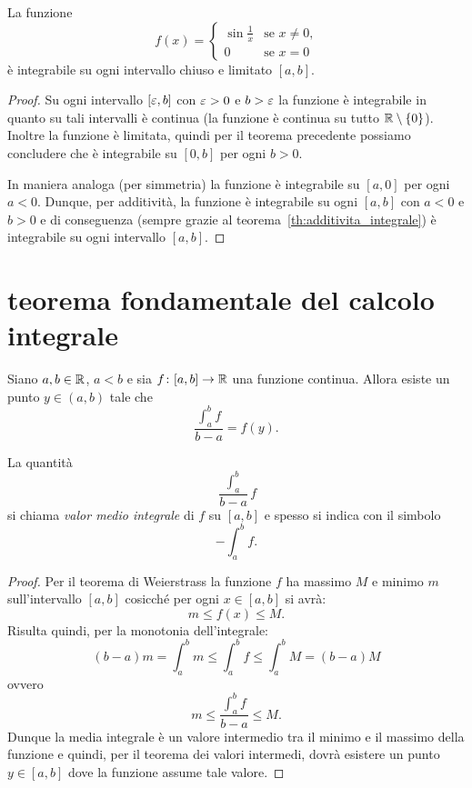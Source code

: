 \begin{example}
La funzione
\[
  f(x) = \begin{cases}
  \sin\frac 1 x & \text{se $x\neq 0$,}\\
  0 & \text{se $x=0$}
  \end{cases}
\]
è integrabile su ogni intervallo chiuso e limitato $[a,b]$.
\end{example}
\begin{proof}
Su ogni intervallo $[\varepsilon,b]$ con $\varepsilon>0$ e $b>\varepsilon$ la funzione
è integrabile in quanto su tali intervalli è continua (la funzione è continua su
tutto $\mathbb R\setminus\{0\}$). Inoltre la funzione è limitata, quindi per il teorema
precedente possiamo concludere che è integrabile su $[0,b]$ per ogni $b>0$.

In maniera analoga (per simmetria) la funzione è integrabile su $[a,0]$
per ogni $a<0$.
Dunque, per additività, la funzione è integrabile su ogni $[a,b]$ con $a<0$ e $b>0$
e di conseguenza (sempre grazie al teorema~\ref{th:additivita_integrale})
è integrabile su ogni intervallo $[a,b]$.
\end{proof}

\section{teorema fondamentale del calcolo integrale}

\begin{theorem}
\mymark{***}
Siano $a,b\in \mathbb R$, $a<b$ e sia
$f\colon [a,b] \to \mathbb R$ una funzione continua.
Allora esiste un punto $y \in (a,b)$
tale che
\[
\frac{\int_a^b f}{b-a} = f(y).
\]
\end{theorem}
%
La quantità
\[
  \frac{\int_a^b}{b-a} f
\]
si chiama \emph{valor medio integrale} di $f$ su $[a,b]$ e spesso
si indica con il simbolo
\[
  -\!\!\!\!\!\!\int_a^b f.
\]
%
\begin{proof}
\mymark{***}
Per il teorema di Weierstrass la funzione $f$ ha massimo $M$ e minimo $m$
sull'intervallo $[a,b]$ cosicché
per ogni $x\in [a,b]$ si avrà:
\[
  m \le f(x) \le M.
\]
Risulta quindi, per la monotonia dell'integrale:
\[
  (b-a) m = \int_a^b m \le \int_a^b f \le \int_a^b M = (b-a) M
\]
ovvero
\[
  m \le \frac{\int_a^b f}{b-a} \le M.
\]
Dunque la media integrale è un valore intermedio tra il minimo e il massimo
della funzione e quindi, per il teorema dei valori intermedi,
dovrà esistere un punto $y\in [a,b]$ dove la funzione assume tale valore.
\end{proof}


